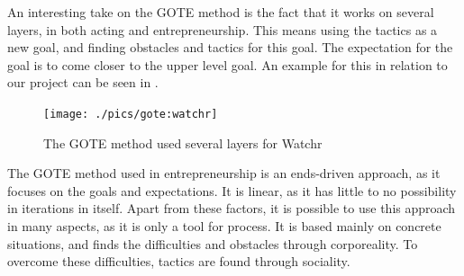 An interesting take on the GOTE method is the fact that it works on several layers, in both acting and entrepreneurship. This means using the tactics as a new goal, and finding obstacles and tactics for this goal. The expectation for the goal is to come closer to the upper level goal. An example for this in relation to our project can be seen in .


\begin{figure}[h]
\begin{center}
\texttt{[image: ./pics/gote:watchr]}
\caption{The GOTE method used several layers for Watchr}
\label{fig:gote_watchr}
\end{center}
\end{figure}

The GOTE method used in entrepreneurship is an ends-driven approach, as it focuses on the goals and expectations. It is linear, as it has little to no possibility in iterations in itself. Apart from these factors, it is possible to use this approach in many aspects, as it is only a tool for process. It is based mainly on concrete situations, and finds the difficulties and obstacles through corporeality. To overcome these difficulties, tactics are found through sociality.